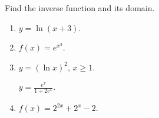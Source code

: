 Find the inverse function and its domain. 
\begin{enumerate}[ref={\fcProblemRef}]
\item  \label{problemFindInversey=ln(x+3)} $\displaystyle y=\ln (x+3)$.

\item  $f(x)=e^{x^3}$.


\item \label{problemFindInversey=(lnx)^2} $\displaystyle y=(\ln x)^2$, $x\geq 1$.


 \label{problemFindInversey=e^x/(1+2e^x)}  $\displaystyle y=\frac{e^x}{1+2e^x}$.


\item \label{problemFindInversef=2^(2x)+2^x-2} $f(x)=2^{2x}+2^{x}-2$.

\end{enumerate}

